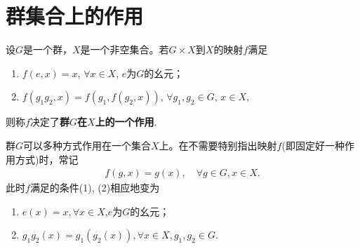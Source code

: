 \documentclass[../../main.tex]{subfiles}%
\begin{document}
\section{群集合上的作用}


\begin{definition}[群作用]\label{definition:群集合上的作用的定义}
设$G$是一个群，$X$是一个非空集合。若$G \times X$到$X$的映射$f$满足
\begin{enumerate}[(1)]
\item $f(e, x) = x$, $\forall x \in X$, $e$为$G$的幺元；
\item $f(g_1g_2, x) = f(g_1, f(g_2, x))$, $\forall g_1, g_2 \in G$, $x \in X$,
\end{enumerate}
则称$f$决定了\textbf{群$G$在$X$上的一个作用}.

群$G$可以多种方式作用在一个集合$X$上。在不需要特别指出映射$f$(即固定好一种作用方式)时，常记
\begin{align*}
f(g, x) = g(x), \quad \forall g \in G, x \in X.
\end{align*}
此时$f$满足的条件(1), (2)相应地变为
\begin{enumerate}[(1)]
\item $e(x) = x, \forall x \in X$,$e$为$G$的幺元；
\item $g_1g_2(x) = g_1(g_2(x)), \forall x \in X, g_1, g_2 \in G$.
\end{enumerate}
\end{definition}
\end{document}
